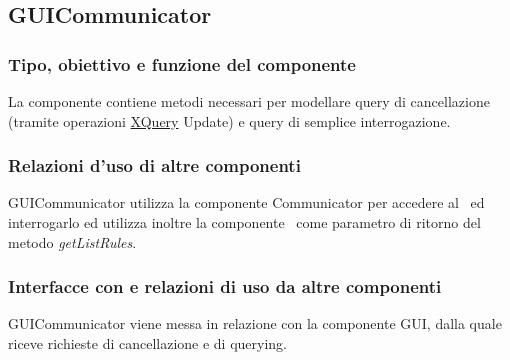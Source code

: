 \subsection{GUICommunicator}
\subsubsection{Tipo, obiettivo e funzione del componente}
La componente contiene metodi necessari per modellare query di cancellazione (tramite operazioni \underline{XQuery} Update) e query di semplice interrogazione.
\subsubsection{Relazioni d'uso di altre componenti}
GUICommunicator utilizza la componente Communicator per accedere al \rp\ ed interrogarlo ed utilizza inoltre la componente \BR\ come parametro di ritorno del metodo \textit{getListRules}.
\subsubsection{Interfacce con e relazioni di uso da altre componenti}
GUICommunicator viene messa in relazione con la componente GUI, dalla quale riceve richieste di cancellazione e di querying.
